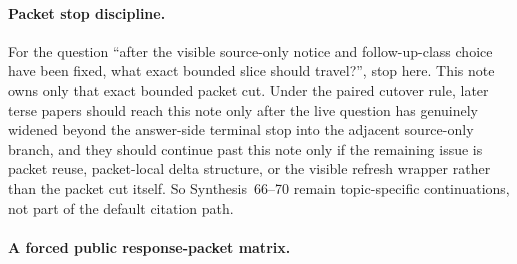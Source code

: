 \documentclass[11pt]{article}
\begin{document}
\paragraph{Packet stop discipline.}
For the question ``after the visible source-only notice and follow-up-class choice have been fixed, what exact bounded slice should travel?'', stop here. This note owns only that exact bounded packet cut. Under the paired cutover rule, later terse papers should reach this note only after the live question has genuinely widened beyond the answer-side terminal stop into the adjacent source-only branch, and they should continue past this note only if the remaining issue is packet reuse, packet-local delta structure, or the visible refresh wrapper rather than the packet cut itself.\cite{series:pairedterminalcutoverrules} So Synthesis~66--70 remain topic-specific continuations, not part of the default citation path.

\paragraph{A forced public response-packet matrix.}
\end{document}
